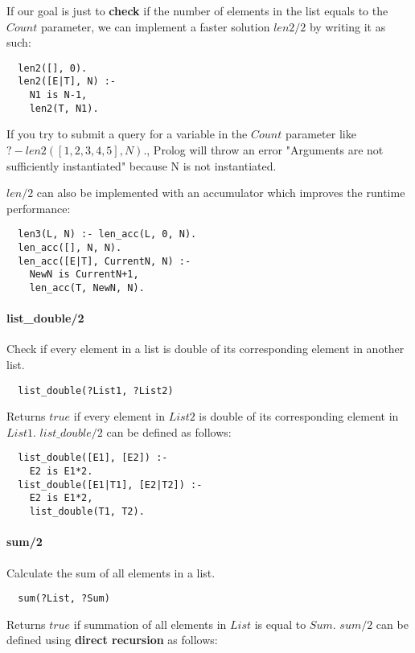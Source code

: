 \documentclass{article}
\begin{document}
\begin{multicols}{2}
  If our goal is just to {\bf check} if the number of elements in the list equals to the $Count$ parameter, we can implement a faster solution $len2/2$ by writing it as such:
  
  \begin{lstlisting} 
  len2([], 0).
  len2([E|T], N) :-
    N1 is N-1,
  	len2(T, N1).
  \end{lstlisting}
  
  If you try to submit a query for a variable in the $Count$ parameter like $?- len2([1, 2, 3, 4, 5], N).$, Prolog will throw an error "Arguments are not sufficiently instantiated" because N is not instantiated.
  
  $len/2$ can also be implemented with an accumulator which improves the runtime performance:
  
  \begin{lstlisting} 
  len3(L, N) :- len_acc(L, 0, N).
  len_acc([], N, N).
  len_acc([E|T], CurrentN, N) :-
	NewN is CurrentN+1,
	len_acc(T, NewN, N).
  \end{lstlisting}  
  
  \paragraph{list\_double/2} Check if every element in a list is double of its corresponding element in another list.
  
  \begin{lstlisting}
  list_double(?List1, ?List2)
  \end{lstlisting} 
  
  Returns $true$ if every element in $List2$ is double of its corresponding element in $List1$. $list\_double/2$ can be defined as follows:

  \begin{lstlisting}
  list_double([E1], [E2]) :-
    E2 is E1*2.
  list_double([E1|T1], [E2|T2]) :-
    E2 is E1*2,
    list_double(T1, T2).
  \end{lstlisting} 
  
  \paragraph{sum/2} Calculate the sum of all elements in a list.
  
  \begin{lstlisting}
  sum(?List, ?Sum)
  \end{lstlisting} 
  
  Returns $true$ if summation of all elements in $List$ is equal to $Sum$. $sum/2$ can be defined using {\bf direct recursion} as follows:


\end{multicols}
\end{document}

